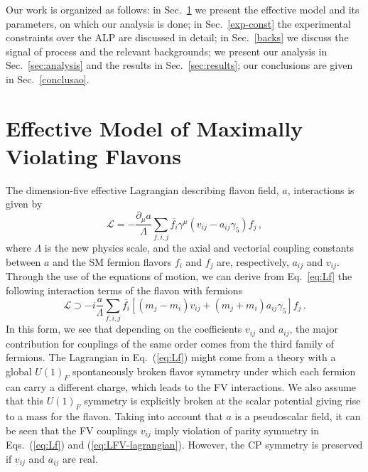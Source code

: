 \documentclass[prd,amsfonts,onecolumn,superscriptaddress,aps,nofootinbib,11pt]{revtex4-1}
\begin{document}
Our work is organized as follows: in Sec.~\ref{sec:model} we present the effective model and its parameters, on which our analysis is done; in Sec.~\ref{exp-const} the experimental constraints over the ALP are discussed in detail; in Sec.~\ref{backs} we discuss the signal of process and the relevant backgrounds; we present our analysis in Sec.~\ref{sec:analysis} and the results in Sec.~\ref{sec:results}; our conclusions are given in Sec.~\ref{conclusao}.

\section{Effective Model of Maximally Violating Flavons}
\label{sec:model}

The dimension-five effective Lagrangian describing flavon field, $a$, interactions is given by \cite{Cornella:2019uxs} 
\begin{equation}
    \mathcal{L} = - \frac{\partial_\mu a}{\Lambda} \sum_{f, i, j} \overline{f_i} \gamma^\mu (v_{ij} - a_{ij}\gamma_5) f_j \,,
    \label{eq:Lf}
\end{equation}
where $\Lambda$ is the new physics scale, and the axial and vectorial coupling constants between $a$ and the SM fermion flavors $f_i$ and $f_j$ are, respectively, $a_{ij}$ and $v_{ij}$. Through the use of the equations of motion, we can derive from Eq.~\eqref{eq:Lf} the following interaction terms of the flavon with fermions 
\begin{equation}
\label{eq:LFV-lagrangian}
    \mathcal{L} \supset -i \frac{a}{\Lambda} \sum_{f, i, j} \overline{f_i} \left[ (m_j - m_i) v_{ij} +  (m_j + m_i) a_{ij} \gamma_5 \right] f_j \,.
\end{equation}
In this form, we see that depending on the coefficients $v_{ij}$ and $a_{ij}$, the major contribution for couplings of the same order comes from the third family of fermions. The Lagrangian in Eq.~(\ref{eq:Lf}) might come from a theory with a global $U(1)_F$ spontaneously broken flavor symmetry under which each fermion can carry a different charge, which leads to the FV interactions. We also assume that this $U(1)_F$ symmetry is explicitly broken at the scalar potential giving rise to a mass for the flavon. Taking into account that $a$ is a pseudoscalar field, it can be seen that the FV couplings $v_{ij}$ imply violation of parity symmetry in Eqs.~(\ref{eq:Lf}) and (\ref{eq:LFV-lagrangian}). However, the CP symmetry is preserved if $v_{ij}$ and $a_{ij}$ are real. %
\end{document}
